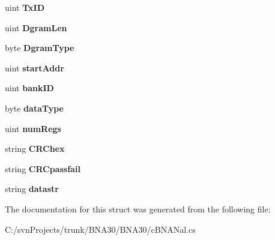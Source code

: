 \begin{DoxyCompactItemize}
uint {\bfseries Tx\+ID}
\item 
\mbox{\label{struct_b_n_a30_1_1_net_anal_b_n_1_1packetdata_ac1f52391691541a5a3ccecc873e159e6}} 
uint {\bfseries Dgram\+Len}
\item 
\mbox{\label{struct_b_n_a30_1_1_net_anal_b_n_1_1packetdata_a8b8886f115d2adb652b9f272db7cf69a}} 
byte {\bfseries Dgram\+Type}
\item 
\mbox{\label{struct_b_n_a30_1_1_net_anal_b_n_1_1packetdata_a5f1ca785949ef0b7c56aed6c155df186}} 
uint {\bfseries start\+Addr}
\item 
\mbox{\label{struct_b_n_a30_1_1_net_anal_b_n_1_1packetdata_a9262cfbae13022e82671d43f31cd636b}} 
uint {\bfseries bank\+ID}
\item 
\mbox{\label{struct_b_n_a30_1_1_net_anal_b_n_1_1packetdata_a5949333868f6e350cb5ca081cf86484a}} 
byte {\bfseries data\+Type}
\item 
\mbox{\label{struct_b_n_a30_1_1_net_anal_b_n_1_1packetdata_a5ec5d5131d9dd226fe60570dffe26fb4}} 
uint {\bfseries num\+Regs}
\item 
\mbox{\label{struct_b_n_a30_1_1_net_anal_b_n_1_1packetdata_ab632dd95f10d4ace0b44a2e19d63b94a}} 
string {\bfseries C\+R\+Chex}
\item 
\mbox{\label{struct_b_n_a30_1_1_net_anal_b_n_1_1packetdata_a72997880ef048784278cdc1be3bba41d}} 
string {\bfseries C\+R\+Cpassfail}
\item 
\mbox{\label{struct_b_n_a30_1_1_net_anal_b_n_1_1packetdata_ac9d7e7da2a6d5056fb7e0792718d9dfd}} 
string {\bfseries datastr}
\end{DoxyCompactItemize}


The documentation for this struct was generated from the following file\+:\begin{DoxyCompactItemize}
\item 
C\+:/svn\+Projects/trunk/\+B\+N\+A30/\+B\+N\+A30/c\+B\+N\+A\+Nal.\+cs\end{DoxyCompactItemize}
